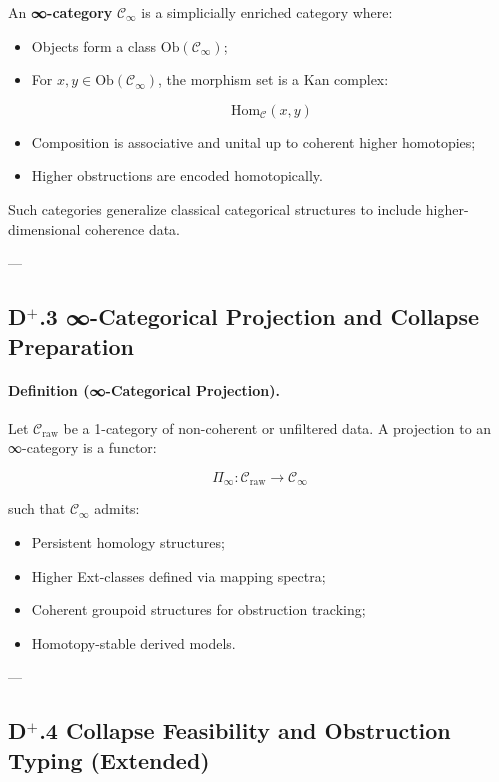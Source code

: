 \documentclass[11pt]{article}
\begin{document}
An \textbf{∞-category} $\mathcal{C}_\infty$ is a simplicially enriched category where:

\begin{itemize}
    \item Objects form a class $\mathrm{Ob}(\mathcal{C}_\infty)$;
    \item For $x, y \in \mathrm{Ob}(\mathcal{C}_\infty)$, the morphism set is a Kan complex:
    
    \[
    \mathrm{Hom}_{\mathcal{C}}(x, y)
    \]
    
    \item Composition is associative and unital up to coherent higher homotopies;
    \item Higher obstructions are encoded homotopically.
\end{itemize}


Such categories generalize classical categorical structures to include higher-dimensional coherence data.

---

\subsection*{D$^{+}$.3 ∞-Categorical Projection and Collapse Preparation}

\paragraph{Definition (∞-Categorical Projection).}

Let $\mathcal{C}_{\mathrm{raw}}$ be a 1-category of non-coherent or unfiltered data. A projection to an ∞-category is a functor:

\[
\Pi_\infty : \mathcal{C}_{\mathrm{raw}} \to \mathcal{C}_\infty
\]

such that $\mathcal{C}_\infty$ admits:

\begin{itemize}
    \item Persistent homology structures;
    \item Higher Ext-classes defined via mapping spectra;
    \item Coherent groupoid structures for obstruction tracking;
    \item Homotopy-stable derived models.
\end{itemize}

---

\subsection*{D$^{+}$.4 Collapse Feasibility and Obstruction Typing (Extended)}
\end{document}
